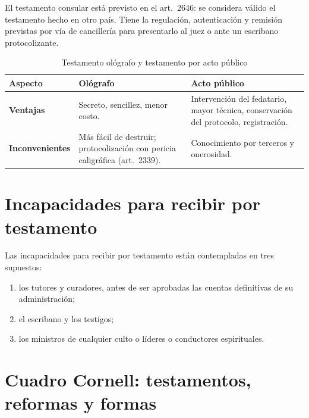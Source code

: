 \documentclass[12pt,oneside]{book}
\begin{document}
El testamento consular está previsto en el art.~2646: se considera válido el testamento hecho en otro país. Tiene la regulación, autenticación y remisión previstas por vía de cancillería para presentarlo al juez o ante un escribano protocolizante.

\begin{table}[H]
\centering
\caption{Testamento ológrafo y testamento por acto público}
\small
\begin{tabularx}{\textwidth}{@{}>{\raggedright\arraybackslash}p{2.6cm}>{\raggedright\arraybackslash}X>{\raggedright\arraybackslash}X@{}}
\toprule
\textbf{Aspecto} & \textbf{Ológrafo} & \textbf{Acto público} \\
\midrule
\textbf{Ventajas} & Secreto, sencillez, menor costo. & Intervención del fedatario, mayor técnica, conservación del protocolo, registración. \\
\textbf{Inconvenientes} & Más fácil de destruir; protocolización con pericia caligráfica (art.~2339). & Conocimiento por terceros y onerosidad. \\
\bottomrule
\end{tabularx}
\end{table}

\section{Incapacidades para recibir por testamento}

Las incapacidades para recibir por testamento están contempladas en tres supuestos:

\begin{enumerate}
    \item los tutores y curadores, antes de ser aprobadas las cuentas definitivas de su administración;
    \item el escribano y los testigos;
    \item los ministros de cualquier culto o líderes o conductores espirituales.
\end{enumerate}

\section{Cuadro Cornell: testamentos, reformas y formas}
\end{document}
